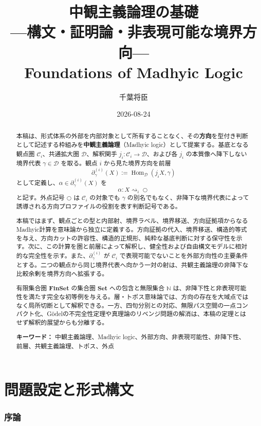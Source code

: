 \documentclass[a4paper,11pt]{ltjsarticle}
\title{中観主義論理の基礎\\[0.2em]
  {\Large ---構文・証明論・非表現可能な境界方向---}\\[0.4em]
  {\large Foundations of Madhyic Logic}}
\author{千葉将臣}
\date{2026-08-24}
\theoremstyle{definition}
\theoremstyle{plain}
\newcommand{\Hom}{\operatorname{Hom}}
\newcommand{\Set}{\mathbf{Set}}
\newcommand{\FinSet}{\mathbf{FinSet}}
\newcommand{\dfix}{\bigcirc}
\begin{document}
\maketitle

\begin{abstract}
本稿は、形式体系の外部を内部対象として所有することなく、その\textbf{方向}を型付き判断として記述する枠組みを\textbf{中観主義論理}（Madhyic logic）として提案する。基底となる観点圏 $\mathcal C_i$、共通拡大圏 $\mathcal D$、解釈関手 $j_i:\mathcal C_i\to\mathcal D$、および各 $j_i$ の本質像へ降下しない境界代表 $\gamma\in\mathcal D$ を取る。観点 $i$ から見た境界方向を前層
\[
 \partial_\gamma^{(i)}(X)
 :=\Hom_{\mathcal D}(j_iX,\gamma)
\]
として定義し、$\alpha\in\partial_\gamma^{(i)}(X)$ を
\[
 \alpha:X\rightsquigarrow_i\dfix
\]
と記す。外点記号 $\dfix$ は $\mathcal C_i$ の対象でも $\gamma$ の別名でもなく、非降下な境界代表によって誘導される方向プロファイルの役割を表す判断記号である。

本稿ではまず、観点ごとの型と内部射、境界ラベル、境界移送、方向証拠項からなるMadhyic計算を意味論から独立に定義する。方向証拠の代入、境界移送、構造的等式を与え、方向カットの許容性、構造的正規形、純粋な基底判断に対する保守性を示す。次に、この計算を圏と前層によって解釈し、健全性および自由構文モデルに相対的な完全性を示す。また、$\partial_\gamma^{(i)}$ が $\mathcal C_i$ で表現可能でないことを外部方向性の主要条件とする。二つの観点から同じ境界代表へ向かう一対の射は、共観主義論理の非降下な比較余剰を境界方向へ拡張する。

有限集合圏 $\FinSet$ の集合圏 $\Set$ への包含と無限集合 $\mathbb N$ は、非降下性と非表現可能性を満たす完全な初等例を与える。層・トポス意味論では、方向の存在を大域点ではなく局所切断として解釈できる。一方、四句分別との対応、無限パス空間の一点コンパクト化、Gödelの不完全性定理や真理論のリベンジ問題の解消は、本稿の定理とはせず解釈的展望からも分離する。

\medskip
\noindent\textbf{キーワード：} 中観主義論理、Madhyic logic、外部方向、非表現可能性、非降下性、前層、共観主義論理、トポス、外点
\end{abstract}

\tableofcontents

\part{問題設定と形式構文}

\section{序論}
\end{document}

